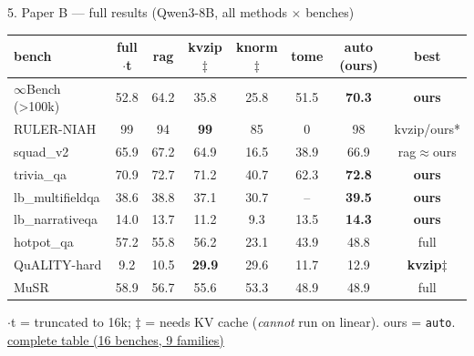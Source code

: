 \documentclass[aspectratio=169]{beamer}
\newcommand{\ghbase}{https://github.com/BDeMo/research-notes/blob/main/notes/plans/08-compressed-context-memory}
\newcommand{\ghB}[2]{\href{\ghbase/papers/paper-b-forgetting-gating/#1}{\color{blue}\underline{#2}}}
\newcommand{\best}[1]{\textbf{#1}}
\begin{document}
\begin{frame}{5. Paper B --- full results (Qwen3-8B, all methods $\times$ benches)}
  \centering\scriptsize
  \begin{tabular}{lccccccc}
  \toprule
  bench & full$\cdot$t & rag & kvzip$\ddagger$ & knorm$\ddagger$ & tome & \best{auto (ours)} & best \\
  \midrule
  $\infty$Bench (>100k) & 52.8 & 64.2 & 35.8 & 25.8 & 51.5 & \best{70.3} & \best{ours} \\
  RULER-NIAH & 99 & 94 & \best{99} & 85 & 0 & 98 & kvzip/ours* \\
  squad\_v2 & 65.9 & 67.2 & 64.9 & 16.5 & 38.9 & 66.9 & rag$\approx$ours \\
  trivia\_qa & 70.9 & 72.7 & 71.2 & 40.7 & 62.3 & \best{72.8} & \best{ours} \\
  lb\_multifieldqa & 38.6 & 38.8 & 37.1 & 30.7 & -- & \best{39.5} & \best{ours} \\
  lb\_narrativeqa & 14.0 & 13.7 & 11.2 & 9.3 & 13.5 & \best{14.3} & \best{ours} \\
  hotpot\_qa & 57.2 & 55.8 & 56.2 & 23.1 & 43.9 & 48.8 & full \\
  QuALITY-hard & 9.2 & 10.5 & \best{29.9} & 29.6 & 11.7 & 12.9 & \best{kvzip$\ddagger$} \\
  MuSR & 58.9 & 56.7 & 55.6 & 53.3 & 48.9 & 48.9 & full \\
  \bottomrule
  \end{tabular}
  \vspace{0.3em}
  \footnotesize $\cdot$t = truncated to 16k; $\ddagger$ = needs KV cache (\emph{cannot} run on linear). ours = \texttt{auto}.
  \ghB{COMPLETE-RESULTS-2026-07-13.md}{complete table (16 benches, 9 families)}
\end{frame}
\end{document}
